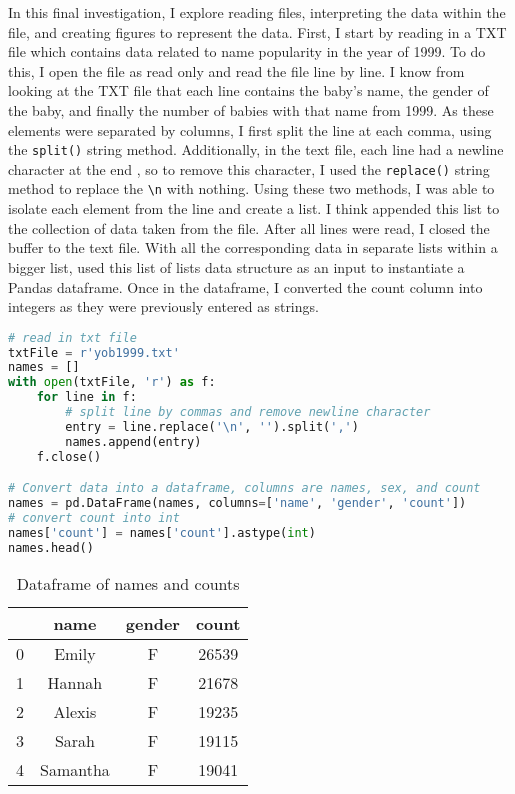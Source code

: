 \documentclass[journal]{IEEEtran}
\begin{document}
In this final investigation, I explore reading files, interpreting the data within the file, and creating figures to represent the data. First, I start by reading in a TXT file which contains data related to name popularity in the year of 1999. To do this, I open the file as read only and read the file line by line. I know from looking at the TXT file that each line contains the baby’s name, the gender of the baby, and finally the number of babies with that name from 1999. As these elements were separated by columns, I first split the line at each comma, using the \lstinline{split()} string method. Additionally, in the text file, each line had a newline character at the end , so to remove this character, I used the \lstinline{replace()} string method to replace the \lstinline{\n} with nothing. Using these two methods, I was able to isolate each element from the line and create a list. I think appended this list to the collection of data taken from the file. After all lines were read, I closed the buffer to the text file. With all the corresponding data in separate lists within a bigger list, used this list of lists data structure as an input to instantiate a Pandas dataframe. Once in the dataframe, I converted the count column into integers as they were previously entered as strings.
\begin{lstlisting}[language=Python, caption={Reading TXT file data}]
# read in txt file
txtFile = r'yob1999.txt'
names = []
with open(txtFile, 'r') as f: 
    for line in f:
        # split line by commas and remove newline character
        entry = line.replace('\n', '').split(',')
        names.append(entry)
    f.close()

# Convert data into a dataframe, columns are names, sex, and count
names = pd.DataFrame(names, columns=['name', 'gender', 'count'])
# convert count into int 
names['count'] = names['count'].astype(int)
names.head()
\end{lstlisting}
\begin{table}[h!]
\centering
\begin{tabular}{ c | c c c }
 & name & gender & count \\ 
\hline
0 & Emily & F & 26539 \\  
1 & Hannah & F & 21678 \\
2 & Alexis & F & 19235 \\
3 & Sarah & F & 19115 \\
4 & Samantha & F & 19041
\end{tabular}
\caption{Dataframe of names and counts}
\end{table}
\end{document}
